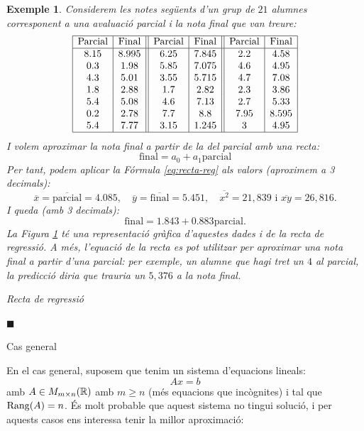 \documentclass[
  11pt,
]{book}
\makeatletter
\numberwithin{dummy}{section}
\theoremstyle{maincolornumbox}
\theoremstyle{blacknumex}
\newtheorem{exampleT}{Exemple}[chapter]
\theoremstyle{blacknumbox}
\theoremstyle{maincolornum}
\newenvironment{example}{\begin{exampleT}}{\hfill{\tiny\ensuremath{\blacksquare}}\end{exampleT}}
\renewcommand{\subsection}{\@startsection {subsection}{2}{\z@}
{-3ex \@plus -0.1ex \@minus -.4ex}
{0.5ex \@plus.2ex }
{\normalfont\sffamily\bfseries}}
\newlength\esp
\makeatother
\begin{document}
\begin{example}

Considerem les notes següents d'un grup de \(21\) alumnes corresponent a
una avaluació parcial i la nota final que van treure:
\[\begin{array}{|c|c||c|c||c|c|}
\hline\text{Parcial} & \text{Final} & \text{Parcial} & \text{Final} & \text{Parcial} & \text{Final}  \\ \hline
8.15 & 8.995 & 6.25 & 7.845 & 2.2 & 4.58 \\
0.3 & 1.98 & 5.85 & 7.075 & 4.6 &4.95 \\
4.3&5.01 & 3.55 & 5.715 & 4.7 & 7.08\\
1.8&2.88 & 1.7 & 2.82 & 2.3 & 3.86\\
5.4&5.08 & 4.6 & 7.13 & 2.7 &5.33 \\
0.2 &2.78 & 7.7 & 8.8 & 7.95 &8.595\\
5.4 & 7.77 & 3.15 &1.245 & 3 &4.95\\ \hline
\end{array}\] I volem aproximar la nota final a partir de la del parcial
amb una recta: \[\text{final}= a_0 + a_1 \text{parcial}\] Per tant,
podem aplicar la Fórmula
\eqref{eq:recta-reg} als valors (aproximem a 3 decimals):
\[\overline{x}=\overline{\text{parcial}}= 4.085, \quad
\overline{y}=\overline{\text{final}}= 5.451, \quad
\overline{x^2}=21,839 \text{ i }
\overline{xy}= 26,816.\] I queda (amb 3 decimals):
\[\text{final}= 1.843 + 0.883 \text{parcial}.\] La Figura
\protect\hyperlink{fig:recta-reg}{1} té
una representació gràfica d'aquestes dades i de la recta de regressió. A
més, l'equació de la recta es pot utilitzar per aproximar una nota final
a partir d'una parcial: per exemple, un alumne que hagi tret un \(4\) al
parcial, la predicció diria que trauria un \(5,376\) a la nota final.

Recta de regressió\protect\hypertarget{fig:recta-reg}{}{}

\end{example}

\hypertarget{cas-general}{%
\subsection{Cas general}\label{cas-general}}

En el cas general, suposem que tenim un sistema d'equacions lineals:
\[A x = b\] amb \(A\in M_{m\times n}(\mathbb{R})\) amb \(m\geq n\) (més equacions
que incògnites) i tal que \(\operatorname{Rang}(A)=n\). És molt probable que aquest
sistema no tingui solució, i per aquests casos ens interessa tenir la
millor aproximació:
\end{document}
